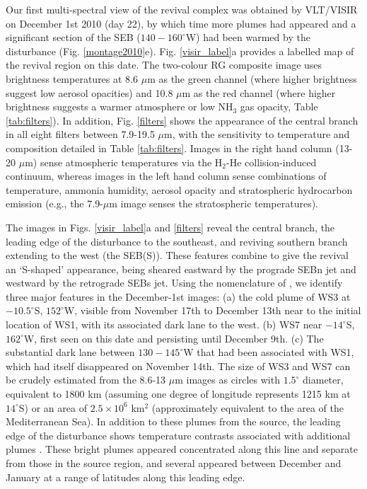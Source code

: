 \documentclass[final,authoryear,5p,times,twocolumn]{elsarticle}
\begin{document}
Our first multi-spectral view of the revival complex was obtained by VLT/VISIR on December 1st 2010 (day 22), by which time more plumes had appeared and a significant section of the SEB ($140-160^\circ$W) had been warmed by the disturbance (Fig. \ref{montage2010}e).  Fig. \ref{visir_label}a provides a labelled map of the revival region on this date.  The two-colour RG composite image uses brightness temperatures at 8.6 $\mu$m as the green channel (where higher brightness suggest low aerosol opacities) and 10.8 $\mu$m as the red channel (where higher brightness suggests a warmer atmosphere or low NH$_3$ gas opacity, Table \ref{tab:filters}).  In addition, Fig. \ref{filters} shows the appearance of the central branch in all eight filters between 7.9-19.5 $\mu$m, with the sensitivity to temperature and composition detailed in Table \ref{tab:filters}.  Images in the right hand column (13-20 $\mu$m) sense atmospheric temperatures via the H$_2$-He collision-induced continuum, whereas images in the left hand column sense combinations of temperature, ammonia humidity, aerosol opacity and stratospheric hydrocarbon emission (e.g., the 7.9-$\mu$m image senses the stratospheric temperatures).    

The images in Figs. \ref{visir_label}a and \ref{filters} reveal the central branch, the leading edge of the disturbance to the southeast, and reviving southern branch extending to the west (the SEB(S)).  These features combine to give the revival an `S-shaped' appearance, being sheared eastward by the prograde SEBn jet and westward by the retrograde SEBs jet.   Using the nomenclature of \citet{16rogers}, we identify three major features in the December-1st images:  (a) the cold plume of WS3 at $-10.5^\circ$S, $152^\circ$W, visible from November 17th to December 13th near to the initial location of WS1, with its associated dark lane to the west.  (b) WS7 near $-14^\circ$S, $162^\circ$W, first seen on this date and persisting until December 9th.  (c) The substantial dark lane between $130-145^\circ$W that had been associated with WS1, which had itself disappeared on November 14th.  The size of WS3 and WS7 can be crudely estimated from the 8.6-13 $\mu$m images as circles with $1.5^\circ$ diameter, equivalent to 1800 km (assuming one degree of longitude represents 1215 km at $14^\circ$S) or an area of $2.5\times10^6$ km$^2$ (approximately equivalent to the area of the Mediterranean Sea).  In addition to these plumes from the source, the leading edge of the disturbance shows temperature contrasts associated with additional plumes \citep[WS5 and WS6,][]{11rogers_21}.  These bright plumes appeared concentrated along this line and separate from those in the source region, and several appeared between December and January at a range of latitudes along this leading edge.  
\end{document}
